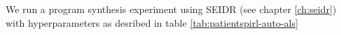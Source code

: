 \begin{comment}
How do these simulators fare with respect to \emph{accuracy} criteria we set out in the introduction? 
The factors that contribute to a simulator's accuracy are reviewed in table \ref{tab:trustview}.
\emph{GYMIC} and \emph{GraphSim} are the only simulators trained on a large dataset and GYMIC's accurracy has known overfitting issues.
\emph{GraphSim} is thus the most accurate of the simulators.

The most \emph{transparent} simulator is clearly \emph{HeartPole}.
It does not aim to model any real clinical scenario accurately, but it can be a useful development tool to help scrutinize reinforcement learning algorithms.

As far as \emph{difficulty} is concerned, \emph{HeartPole} \cite{heartpole}, \emph{simglucose} \cite{simglucose-baseline}, and \emph{GYMIC} \cite{gym-sepsis} are known to be solvable with relatively small models and standard reinforcement learning algorithms like DQN \cite{dqn}. 
Thus, the only simulators \emph{difficult} enough to be benchmarks for novel approaches are \emph{Virtu-ALS} and \emph{Auto-ALS} and \emph{Auto-ALS} is the more accessible of the two.

Table \ref{tab:structview} reviews the structural complexity of the simulators, a factor that directly contributes to \emph{difficulty}.
Note that \emph{Virtu-ALS} is an unusually high-dimensional environment.
As such, solving it is likely to require more parameters and longer training times.

Automatic discovery of clinical strategies is a nascent field of research that has a potential to considerably improve patient outcomes and become a new modus operandi in healthcare research.
The goal of this chapter is to provide a solid foundation for further development of this field with better patient simulators and better understanding thereof.
We have reviewed the state of the art in patient simulators, identified some of the problems the field is facing and proposed novel simulators to address them.
We believe that \emph{HeartPole} and \emph{Auto-ALS} can become new standard benchmarks for reinforcement learning in healthcare.

\newpage
\section{Selecting the algorithm}
\end{comment}

We run a program synthesis experiment using SEIDR (see chapter \ref{ch:seidr}) with hyperparameters as desribed in table \ref{tab:patientspirl-auto-als}


